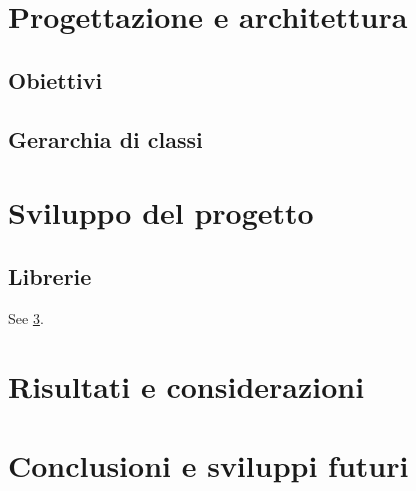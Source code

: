 \documentclass[a4paper,11pt,twoside,openright]{unibo}
\begin{document}
\chapter{Progettazione e architettura}
\label{outline}
\section{Obiettivi}
\section{Gerarchia di classi}
\chapter{Sviluppo del progetto}
\label{sw_devel}
\section{Librerie}
See \ref{tests}.
\chapter{Risultati e considerazioni}
\label{tests}
\chapter{Conclusioni e sviluppi futuri}
\label{conclusions}


\end{document}
